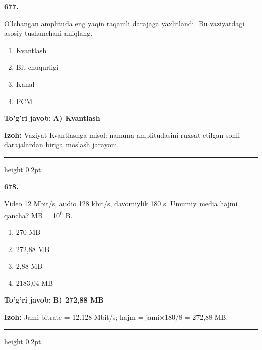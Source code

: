 \documentclass[10pt,a4paper,oneside]{article}
\begin{document}
\noindent\textbf{\color{ink}677.}
\par
O'lchangan amplituda eng yaqin raqamli darajaga yaxlitlandi. Bu vaziyatdagi asosiy tushunchani aniqlang.
\begin{enumerate}[label=\Alph*),leftmargin=9mm]
\item Kvantlash
\item Bit chuqurligi
\item Kanal
\item PCM
\end{enumerate}
\begin{tcolorbox}[enhanced,breakable,colback=teal!4,colframe=teal!50!black,boxrule=0.5pt,arc=1.1mm,left=3mm,right=3mm,top=1.7mm,bottom=1.7mm,before skip=2mm,after skip=2mm]
\textbf{\color{teal}To'g'ri javob:} \textbf{A) Kvantlash}
\par\smallskip
\textbf{Izoh:} Vaziyat Kvantlashga misol: namuna amplitudasini ruxsat etilgan sonli darajalardan biriga moslash jarayoni.
\end{tcolorbox}
\vspace{2mm}\hrule height 0.2pt \vspace{3mm}

\noindent\textbf{\color{ink}678.}
\par
Video 12 Mbit/s, audio 128 kbit/s, davomiylik 180 s. Umumiy media hajmi qancha? MB = 10\textsuperscript{6} B.
\begin{enumerate}[label=\Alph*),leftmargin=9mm]
\item 270 MB
\item 272,88 MB
\item 2,88 MB
\item 2183,04 MB
\end{enumerate}
\begin{tcolorbox}[enhanced,breakable,colback=teal!4,colframe=teal!50!black,boxrule=0.5pt,arc=1.1mm,left=3mm,right=3mm,top=1.7mm,bottom=1.7mm,before skip=2mm,after skip=2mm]
\textbf{\color{teal}To'g'ri javob:} \textbf{B) 272,88 MB}
\par\smallskip
\textbf{Izoh:} Jami bitrate = 12.128 Mbit/s; hajm = jami\ensuremath{\times}180/8 = 272,88 MB.
\end{tcolorbox}
\vspace{2mm}\hrule height 0.2pt \vspace{3mm}
\end{document}
